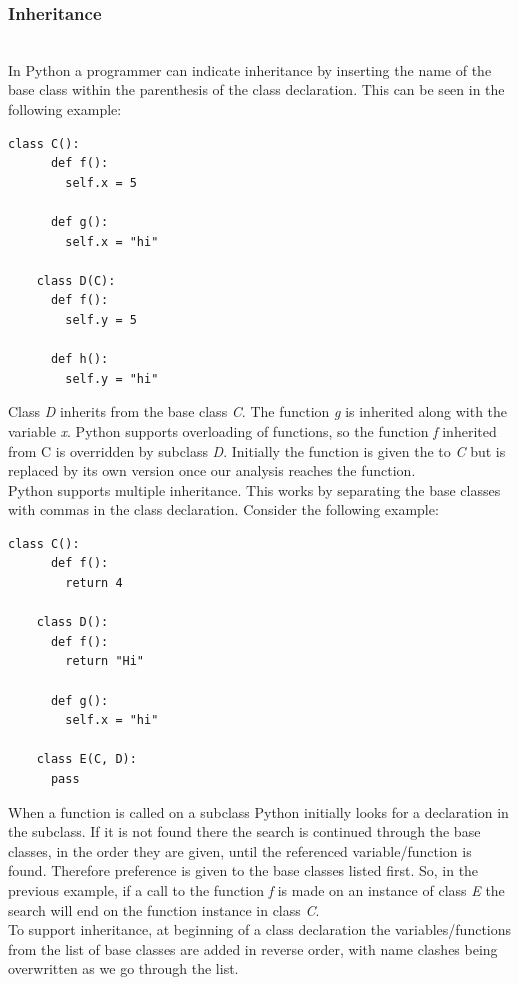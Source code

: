 \documentclass[12pt, titlepage]{article}
\begin{document}
\subsubsection{Inheritance}\mbox{}\\
In Python a programmer can indicate inheritance by inserting the name of the base class within the parenthesis of the class declaration. This can be seen in the following example:
\begin{lstlisting}[mathescape]
	class C():
	  def f():
	    self.x = 5
		
	  def g():
	    self.x = "hi"

	class D(C):
	  def f():
	    self.y = 5
		
	  def h():
	    self.y = "hi"
\end{lstlisting}
Class \textit{D} inherits from the base class \textit{C}. The function \textit{g} is inherited along with the variable \textit{x}. Python supports overloading of functions, so the function \textit{f} inherited from C is overridden by subclass \textit{D}. Initially the function is given the to \textit{C} but is replaced by its own version once our analysis reaches the function. \\
Python supports multiple inheritance. This works by separating the base classes with commas in the class declaration. Consider the following example: 
\begin{lstlisting}[mathescape]
	class C():
	  def f():
	    return 4
	    
	class D():
	  def f():
	    return "Hi"
	    
	  def g():
	    self.x = "hi"

	class E(C, D):
	  pass
\end{lstlisting}
When a function is called on a subclass Python initially looks for a declaration in the subclass. If it is not found there the search is continued through the base classes, in the order they are given, until the referenced variable/function is found. Therefore preference is given to the base classes listed first. So, in the previous example, if a call to the function \textit{f} is made on an instance of class \textit{E} the search will end on the function instance in class \textit{C}. \\
To support inheritance, at beginning of a class declaration the variables/functions from the list of base classes are added in reverse order, with name clashes being overwritten as we go through the list.
\end{document}
